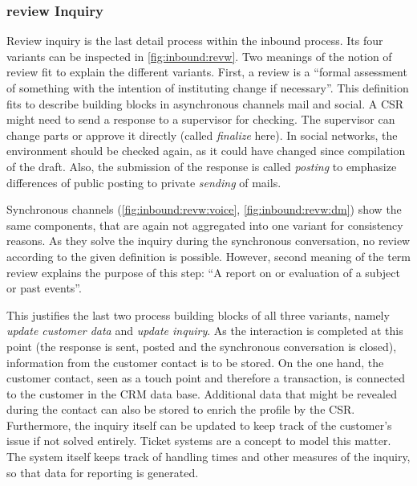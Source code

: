 	 
	 \subsubsection{review Inquiry}
	 \label{inb:review}
	 Review inquiry is the last detail process within the inbound process. Its four variants can be inspected in \Fig \ref{fig:inbound:revw}. Two meanings of the notion of review \citep{oxfordreview} fit to explain the different variants. First, a review is a \enquote{formal assessment of something with the intention of instituting change if necessary}. This definition fits to describe building blocks in asynchronous channels mail and social. A \acrshort{CSR} might need to send a response to a supervisor for checking. The supervisor can change parts or approve it directly (called \textit{finalize} here). In social networks, the environment should be checked again, as it could have changed since compilation of the draft. Also, the submission of the response is called \textit{posting} to emphasize differences of public posting to private \textit{sending} of mails.
	 
	 Synchronous channels (\cf \Fig \ref{fig:inbound:revw:voice}, \ref{fig:inbound:revw:dm}) show the same components, that are again not aggregated into one variant for consistency reasons. As they solve the inquiry during the synchronous conversation, no review according to the given definition is possible. However, second meaning of the term review explains the purpose of this step: \enquote{A report on or evaluation of a subject or past events}. 
	 
	 This justifies the last two process building blocks of all three variants, namely \textit{update customer data} and \textit{update inquiry}. As the interaction is completed at this point (\viz the response is sent, posted and the synchronous conversation is closed), information from the customer contact is to be stored. On the one hand, the customer contact, seen as a touch point and therefore a transaction, is connected to the customer in the \acrshort{CRM} data base. Additional data that might be revealed during the contact can also be stored to enrich the profile by the \acrshort{CSR}. Furthermore, the inquiry itself can be updated to keep track of the customer's issue if not solved entirely. Ticket systems are a concept to model this matter. The system itself  keeps track of handling times and other measures of the inquiry, so that data for reporting is generated. 
	 
